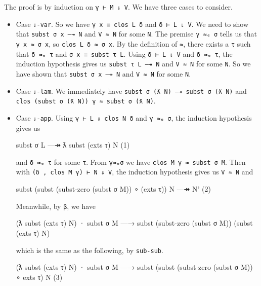 The proof is by induction on \texttt{γ\ ⊢\ M\ ⇓\ V}. We have three cases
to consider.

\begin{itemize}
\item
  Case \texttt{⇓-var}. So we have \texttt{γ\ x\ ≡\ clos\ L\ δ} and
  \texttt{δ\ ⊢\ L\ ⇓\ V}. We need to show that
  \texttt{subst\ σ\ x\ —↠\ N} and \texttt{V\ ≈\ N} for some \texttt{N}.
  The premise \texttt{γ\ ≈ₑ\ σ} tells us that \texttt{γ\ x\ ≈\ σ\ x}, so
  \texttt{clos\ L\ δ\ ≈\ σ\ x}. By the definition of \texttt{≈}, there
  exists a \texttt{τ} such that \texttt{δ\ ≈ₑ\ τ} and
  \texttt{σ\ x\ ≡\ subst\ τ\ L}. Using \texttt{δ\ ⊢\ L\ ⇓\ V} and
  \texttt{δ\ ≈ₑ\ τ}, the induction hypothesis gives us
  \texttt{subst\ τ\ L\ —↠\ N} and \texttt{V\ ≈\ N} for some \texttt{N}.
  So we have shown that \texttt{subst\ σ\ x\ —↠\ N} and \texttt{V\ ≈\ N}
  for some \texttt{N}.
\item
  Case \texttt{⇓-lam}. We immediately have
  \texttt{subst\ σ\ (ƛ\ N)\ —↠\ subst\ σ\ (ƛ\ N)} and
  \texttt{clos\ (subst\ σ\ (ƛ\ N))\ γ\ ≈\ subst\ σ\ (ƛ\ N)}.
\item
  Case \texttt{⇓-app}. Using \texttt{γ\ ⊢\ L\ ⇓\ clos\ N\ δ} and
  \texttt{γ\ ≈ₑ\ σ}, the induction hypothesis gives us

  \begin{myDisplay}
    subst σ L —↠ ƛ subst (exts τ) N                                     (1)
  \end{myDisplay}

  and \texttt{δ\ ≈ₑ\ τ} for some \texttt{τ}. From \texttt{γ≈ₑσ} we have
  \texttt{clos\ M\ γ\ ≈\ subst\ σ\ M}. Then with
  \texttt{(δ\ ,\textquotesingle{}\ clos\ M\ γ)\ ⊢\ N\ ⇓\ V}, the
  induction hypothesis gives us \texttt{V\ ≈\ N\textquotesingle{}} and

  \begin{myDisplay}
    subst (subst (subst-zero (subst σ M)) ∘ (exts τ)) N —↠ N'         (2)
  \end{myDisplay}

  Meanwhile, by \texttt{β}, we have

  \begin{myDisplay}
    (ƛ subst (exts τ) N) · subst σ M
    —→ subst (subst-zero (subst σ M)) (subst (exts τ) N)
  \end{myDisplay}

  which is the same as the following, by \texttt{sub-sub}.

  \begin{myDisplay}
    (ƛ subst (exts τ) N) · subst σ M
    —→ subst (subst (subst-zero (subst σ M)) ∘ exts τ) N              (3)
  \end{myDisplay}


\end{itemize}
